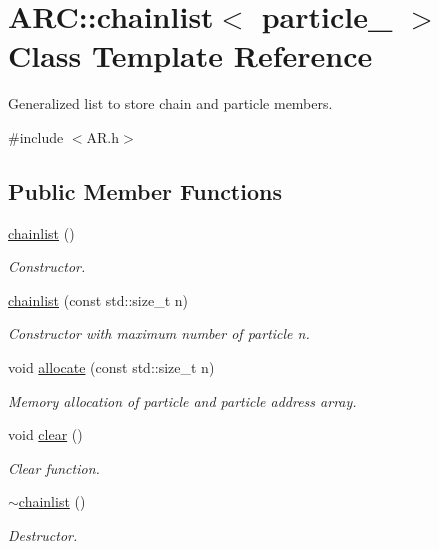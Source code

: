 \hypertarget{classARC_1_1chainlist}{}\section{A\+RC\+:\+:chainlist$<$ particle\+\_\+ $>$ Class Template Reference}
\label{classARC_1_1chainlist}


Generalized list to store chain and particle members.  




{\ttfamily \#include $<$A\+R.\+h$>$}

\subsection*{Public Member Functions}
\begin{DoxyCompactItemize}
\item 
\hyperlink{classARC_1_1chainlist_a12641a795a63d6152c22fc4b363e28c1}{chainlist} ()
\begin{DoxyCompactList}\small\item\em Constructor. \end{DoxyCompactList}\item 
\hyperlink{classARC_1_1chainlist_a85e9f10829f11483253d992aceb901a2}{chainlist} (const std\+::size\+\_\+t n)
\begin{DoxyCompactList}\small\item\em Constructor with maximum number of particle {\itshape n}. \end{DoxyCompactList}\item 
void \hyperlink{classARC_1_1chainlist_ab212df89ec5a2e81ce7525adc04001c1}{allocate} (const std\+::size\+\_\+t n)
\begin{DoxyCompactList}\small\item\em Memory allocation of particle and particle address array. \end{DoxyCompactList}\item 
void \hyperlink{classARC_1_1chainlist_af6b33790ba054657d9e132c177ed7f04}{clear} ()
\begin{DoxyCompactList}\small\item\em Clear function. \end{DoxyCompactList}\item 
\hyperlink{classARC_1_1chainlist_ae4e636b2eb05e8e5665315e8215e2c6d}{$\sim$chainlist} ()
\begin{DoxyCompactList}\small\item\em Destructor. \end{DoxyCompactList}\item 

\end{DoxyCompactItemize}
